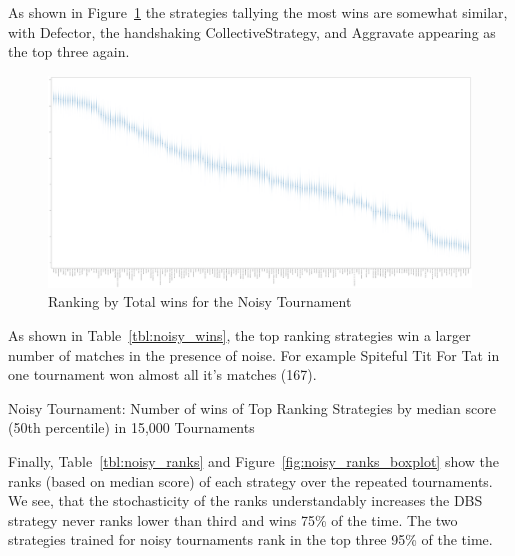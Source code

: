 \documentclass{article}
\begin{document}
As shown in Figure~\ref{fig:noisy_winplot} the strategies tallying the most wins
are somewhat similar, with Defector, the handshaking CollectiveStrategy, and
Aggravate appearing as the top three again.

\begin{landscape}
    \begin{figure}[!hbtp]
        \centering
        \includegraphics[width=\textwidth]{./assets/noisy_wins_boxplots.pdf}
        \caption{Ranking by Total wins for the Noisy Tournament}
        \label{fig:noisy_winplot}
    \end{figure}
\end{landscape}

As shown in Table~\ref{tbl:noisy_wins}, the top ranking strategies win a larger
number of matches in the presence of noise. For example Spiteful Tit For Tat in
one tournament won almost all it's matches (167).

\begin{table}[!hbtp]
    \centering
        
        \caption{Noisy Tournament: Number of wins of Top Ranking Strategies
        by median score (50th percentile) in 15,000 Tournaments}
        \label{tbl:noisy_wins}
\end{table}


Finally, Table~\ref{tbl:noisy_ranks} and
Figure~\ref{fig:noisy_ranks_boxplot} show the ranks (based on median score)
of each strategy over the repeated tournaments. We see, that the stochasticity
of the ranks understandably increases the DBS strategy never ranks lower than
third and wins 75\% of the time. The two strategies trained for noisy
tournaments rank in the top three 95\% of the time.
\end{document}
